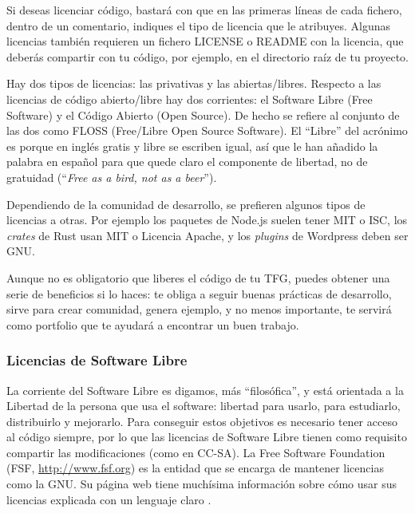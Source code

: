 Si deseas licenciar código, bastará con que en las primeras líneas de cada fichero, dentro de un comentario, indiques el tipo de licencia que le atribuyes. Algunas licencias también requieren un fichero LICENSE o README con la licencia, que deberás compartir con tu código, por ejemplo, en el directorio raíz de tu proyecto.

Hay dos tipos de licencias: las privativas y las abiertas/libres. Respecto a las licencias de código abierto/libre hay dos corrientes: el Software Libre (Free Software) y el Código Abierto (Open Source). De hecho se refiere al conjunto de las dos como FLOSS (Free/Libre Open Source Software). El ``Libre'' del acrónimo es porque en inglés gratis y libre se escriben igual, así que le han añadido la palabra en español para que quede claro el componente de libertad, no de gratuidad (``\textit{Free as a bird, not as a beer}'').

Dependiendo de la comunidad de desarrollo, se prefieren algunos tipos de licencias a otras. Por ejemplo los paquetes de Node.js suelen tener MIT o ISC, los \textit{crates} de Rust usan MIT o Licencia Apache, y los \textit{plugins} de Wordpress deben ser GNU.

Aunque no es obligatorio que liberes el código de tu TFG, puedes obtener una serie de beneficios si lo haces: te obliga a seguir buenas prácticas de desarrollo, sirve para crear comunidad, genera ejemplo, y no menos importante, te servirá como portfolio que te ayudará a encontrar un buen trabajo.

\subsubsection{Licencias de Software Libre}
La corriente del Software Libre es digamos, más ``filosófica'', y está orientada a la Libertad de la persona que usa el software: libertad para usarlo, para estudiarlo, distribuirlo y mejorarlo. Para conseguir estos objetivos es necesario tener acceso al código siempre, por lo que las licencias de Software Libre tienen como requisito compartir las modificaciones (como en CC-SA). La Free Software Foundation (FSF, \url{http://www.fsf.org}) es la entidad que se encarga de mantener licencias como la GNU. Su página web tiene muchísima información sobre cómo usar sus licencias explicada con un lenguaje claro \cite{FSFfaq}.

